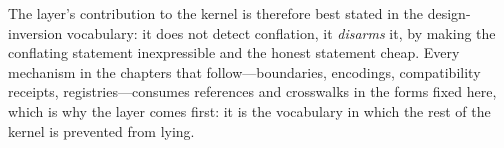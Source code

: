 The layer's contribution to the kernel is therefore best stated in
the design-inversion vocabulary: it does not detect conflation, it
\emph{disarms} it, by making the conflating statement
inexpressible and the honest statement cheap. Every mechanism in
the chapters that follow---boundaries, encodings, compatibility
receipts, registries---consumes references and crosswalks in the
forms fixed here, which is why the layer comes first: it is the
vocabulary in which the rest of the kernel is prevented from
lying.
